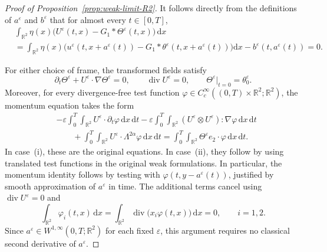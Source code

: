 \documentclass[reqno,11pt,a4paper]{amsart}
\newcommand{\dd}{\mathrm{d}}
\begin{document}
\begin{proof}[Proof of Proposition~\ref{prop:weak-limit-R2}]
It follows directly from the definitions of $a^\varepsilon$ and $b^\varepsilon$ that for almost every $t\in[0,T]$,
\begin{equation}\label{eq:averaged-normalization}
\begin{split}
  & \int_{\mathbb{R}^2} \eta(x) \bigl( U^\varepsilon(t,x) - G_1*\Theta^\varepsilon(t,x) \bigr)\,\dd x \\
  & = \int_{\mathbb{R}^2} \eta(x) \big(u^\varepsilon (t, x+a^\varepsilon(t))  
  - G_1*\theta^\varepsilon(t,x+a^\varepsilon(t)) \big) \dd x 
  -b^\varepsilon(t,a^\varepsilon(t)) = 0.
\end{split}
\end{equation}

For either choice of frame, the transformed fields satisfy
\[
  \partial_t\Theta^\varepsilon
  +U^\varepsilon\cdot\nabla\Theta^\varepsilon=0,
  \qquad
  \operatorname{div}U^\varepsilon=0,
  \qquad
  \Theta^\varepsilon|_{t=0}=\theta_0^\varepsilon.
\]
Moreover, for every divergence-free test function
$\varphi\in C_c^\infty((0,T)\times\mathbb R^2;\mathbb R^2)$,
the momentum equation takes the form
\begin{equation}\label{eq:weak-momentum-translated}
\begin{aligned}
  &-\varepsilon\int_0^T\!\int_{\mathbb R^2}
    U^\varepsilon\cdot\partial_t\varphi\,\dd x\,\dd t
  -\varepsilon\int_0^T\!\int_{\mathbb R^2}
    (U^\varepsilon\otimes U^\varepsilon):\nabla\varphi
    \,\dd x\,\dd t
  \\
  &\qquad
  +\int_0^T\!\int_{\mathbb R^2}
    U^\varepsilon\cdot\Lambda^{2\alpha}\varphi
    \,\dd x\,\dd t
  =
  \int_0^T\!\int_{\mathbb R^2}
    \Theta^\varepsilon e_2\cdot\varphi\,\dd x\,\dd t.
\end{aligned}
\end{equation}
In case~(i), these are the original equations.
In case~(ii), they follow by using translated test
functions in the original weak formulations.
In particular, the momentum identity follows by testing
with $\varphi(t,y-a^\varepsilon(t))$,
justified by smooth approximation of $a^\varepsilon$ in time.
The additional terms cancel using
$\operatorname{div}U^\varepsilon=0$ and
\[
  \int_{\mathbb R^2}\varphi_i(t,x)\,\dd x
  =
  \int_{\mathbb R^2}
    \operatorname{div}\bigl(x_i\varphi(t,x)\bigr)\,\dd x
  =0,
  \qquad i=1,2.
\]
Since $a^\varepsilon\in W^{1,\infty}(0,T;\mathbb R^2)$
for each fixed $\varepsilon$, this argument requires
no classical second derivative of $a^\varepsilon$.


\end{proof}
\end{document}
